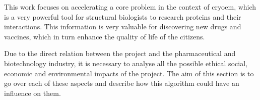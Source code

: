 \documentclass[../main.tex]{subfiles}
\begin{document}
This work focuses on accelerating a core problem in the context of \gls{cryoem}, which is a very powerful tool for structural biologists to research proteins and their interactions. This information is very valuable for discovering new drugs and vaccines, which in turn enhance the quality of life of the citizens. 

Due to the direct relation between the project and the pharmaceutical and biotechnology industry, it is necessary to analyse all the possible ethical social, economic and environmental impacts of the project. The aim of this section is to go over each of these aspects and describe how this algorithm could have an influence on them.
\end{document}

